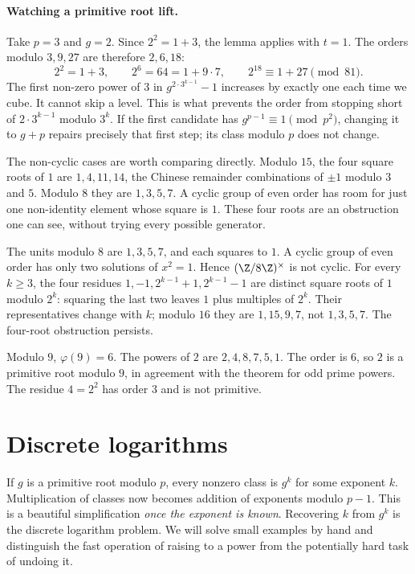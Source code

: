 \paragraph{Watching a primitive root lift.}
Take $p=3$ and $g=2$. Since $2^2=1+3$, the lemma applies with $t=1$.
The orders modulo $3,9,27$ are therefore $2,6,18$:
\[
 2^2=1+3,\qquad 2^6=64=1+9\cdot7,
 \qquad 2^{18}\equiv1+27\pmod{81}.
\]
The first non-zero power of $3$ in $g^{2\cdot3^{k-1}}-1$ increases by
exactly one each time we cube. It cannot skip a level. This is what prevents
the order from stopping short of $2\cdot3^{k-1}$ modulo $3^k$.
If the first candidate has $g^{p-1}\equiv1\pmod{p^2}$, changing it to
$g+p$ repairs precisely that first step; its class modulo $p$ does not change.

The non-cyclic cases are worth comparing directly. Modulo $15$, the four
square roots of $1$ are $1,4,11,14$, the Chinese remainder combinations of
$\pm1$ modulo $3$ and $5$. Modulo $8$ they are $1,3,5,7$.
A cyclic group of even order has room for just one non-identity element whose
square is $1$. These four roots are an obstruction one can see, without
trying every possible generator.

\begin{examplex}
The units modulo $8$ are $1,3,5,7$, and each squares to $1$. A cyclic group of even order has only two solutions of $x^2=1$. Hence $(\Z/8\Z)^\times$ is not cyclic. For every $k\ge3$, the four residues $1,-1,2^{k-1}+1,2^{k-1}-1$ are distinct square roots of $1$ modulo $2^k$: squaring the last two leaves $1$ plus multiples of $2^k$. Their representatives change with $k$; modulo $16$ they are $1,15,9,7$, not $1,3,5,7$. The four-root obstruction persists.
\end{examplex}

\begin{examplex}
Modulo $9$, $\varphi(9)=6$. The powers of $2$ are $2,4,8,7,5,1$. The order is $6$, so $2$ is a primitive root modulo $9$, in agreement with the theorem for odd prime powers. The residue $4=2^2$ has order $3$ and is not primitive.
\end{examplex}

\section{Discrete logarithms}

If $g$ is a primitive root modulo $p$, every nonzero class is $g^k$ for some exponent $k$. Multiplication of classes now becomes addition of exponents modulo $p-1$. This is a beautiful simplification \emph{once the exponent is known}. Recovering $k$ from $g^k$ is the discrete logarithm problem. We will solve small examples by hand and distinguish the fast operation of raising to a power from the potentially hard task of undoing it.

